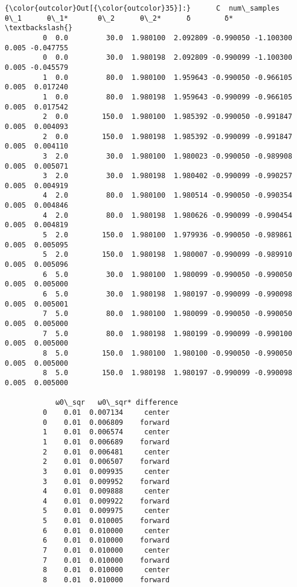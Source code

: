 \documentclass[11pt]{article}
\begin{document}
\begin{Verbatim}[commandchars=\\\{\}]
{\color{outcolor}Out[{\color{outcolor}35}]:}      C  num\_samples       θ\_1      θ\_1*       θ\_2      θ\_2*      δ        δ*  \textbackslash{}
         0  0.0         30.0  1.980100  2.092809 -0.990050 -1.100300  0.005 -0.047755   
         0  0.0         30.0  1.980198  2.092809 -0.990099 -1.100300  0.005 -0.045579   
         1  0.0         80.0  1.980100  1.959643 -0.990050 -0.966105  0.005  0.017240   
         1  0.0         80.0  1.980198  1.959643 -0.990099 -0.966105  0.005  0.017542   
         2  0.0        150.0  1.980100  1.985392 -0.990050 -0.991847  0.005  0.004093   
         2  0.0        150.0  1.980198  1.985392 -0.990099 -0.991847  0.005  0.004110   
         3  2.0         30.0  1.980100  1.980023 -0.990050 -0.989908  0.005  0.005071   
         3  2.0         30.0  1.980198  1.980402 -0.990099 -0.990257  0.005  0.004919   
         4  2.0         80.0  1.980100  1.980514 -0.990050 -0.990354  0.005  0.004846   
         4  2.0         80.0  1.980198  1.980626 -0.990099 -0.990454  0.005  0.004819   
         5  2.0        150.0  1.980100  1.979936 -0.990050 -0.989861  0.005  0.005095   
         5  2.0        150.0  1.980198  1.980007 -0.990099 -0.989910  0.005  0.005096   
         6  5.0         30.0  1.980100  1.980099 -0.990050 -0.990050  0.005  0.005000   
         6  5.0         30.0  1.980198  1.980197 -0.990099 -0.990098  0.005  0.005001   
         7  5.0         80.0  1.980100  1.980099 -0.990050 -0.990050  0.005  0.005000   
         7  5.0         80.0  1.980198  1.980199 -0.990099 -0.990100  0.005  0.005000   
         8  5.0        150.0  1.980100  1.980100 -0.990050 -0.990050  0.005  0.005000   
         8  5.0        150.0  1.980198  1.980197 -0.990099 -0.990098  0.005  0.005000   
         
            ω0\_sqr   ω0\_sqr* difference  
         0    0.01  0.007134     center  
         0    0.01  0.006809    forward  
         1    0.01  0.006574     center  
         1    0.01  0.006689    forward  
         2    0.01  0.006481     center  
         2    0.01  0.006507    forward  
         3    0.01  0.009935     center  
         3    0.01  0.009952    forward  
         4    0.01  0.009888     center  
         4    0.01  0.009922    forward  
         5    0.01  0.009975     center  
         5    0.01  0.010005    forward  
         6    0.01  0.010000     center  
         6    0.01  0.010000    forward  
         7    0.01  0.010000     center  
         7    0.01  0.010000    forward  
         8    0.01  0.010000     center  
         8    0.01  0.010000    forward  
\end{Verbatim}
    
\end{document}
